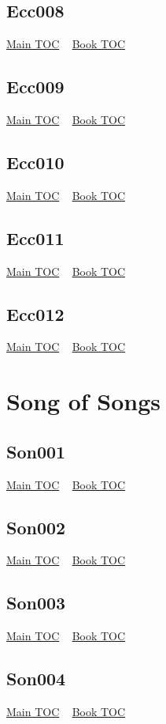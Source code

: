 \documentclass{book}
\begin{document}
  \section{Ecc008}\hyperlink{toc}{Main TOC} ~ \hyperref[subsec:Ecc]{Book TOC} 
  \section{Ecc009}\hyperlink{toc}{Main TOC} ~ \hyperref[subsec:Ecc]{Book TOC} 
  \section{Ecc010}\hyperlink{toc}{Main TOC} ~ \hyperref[subsec:Ecc]{Book TOC} 
  \section{Ecc011}\hyperlink{toc}{Main TOC} ~ \hyperref[subsec:Ecc]{Book TOC} 
  \section{Ecc012}\hyperlink{toc}{Main TOC} ~ \hyperref[subsec:Ecc]{Book TOC} 
  \chapter{Song of Songs} \label{subsec:Son} \begin{multicols}{2} \minitoc \end{multicols}
  \section{Son001}\hyperlink{toc}{Main TOC} ~ \hyperref[subsec:Son]{Book TOC} 
  \section{Son002}\hyperlink{toc}{Main TOC} ~ \hyperref[subsec:Son]{Book TOC} 
  \section{Son003}\hyperlink{toc}{Main TOC} ~ \hyperref[subsec:Son]{Book TOC} 
  \section{Son004}\hyperlink{toc}{Main TOC} ~ \hyperref[subsec:Son]{Book TOC} 
\end{document}
